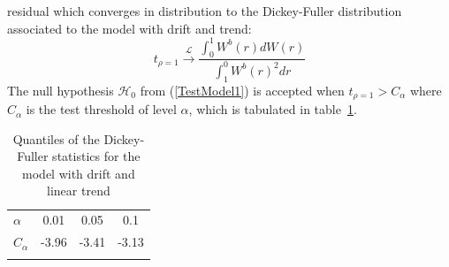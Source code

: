 residual which converges in distribution to the Dickey-Fuller distribution associated to the model with drift and trend:
\begin{equation}
  t_{\rho = 1} \stackrel{\mathcal{L}}{\longrightarrow} \frac{\int_{0}^{1}W^{b}(r) dW(r)}{\int_{1}^{0} W^{b}(r)^2 dr}
\end{equation}
The null hypothesis $\mathcal{H}_0$ from (\ref{TestModel1}) is accepted when $t_{\rho=1} > C_{\alpha}$ where $C_{\alpha}$ is the test threshold of level $\alpha$, which is tabulated in table~\ref{DickeyFullerPval1}.\\

\begin{table}
  \centering
  \begin{tabular}{lccc}
    \hline\noalign{\smallskip}
    $\alpha$ & 0.01 & 0.05 & 0.1 \\
    \noalign{\smallskip}\hline\noalign{\smallskip}
    $C_{\alpha}$ & -3.96 & -3.41 & -3.13 \\
    \noalign{\smallskip}\hline
  \end{tabular}
  \caption{Quantiles of the Dickey-Fuller statistics for the model with drift and linear trend}\label{DickeyFullerPval1}
\end{table}


